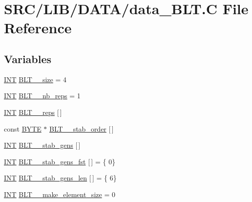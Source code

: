 \hypertarget{data___b_l_t_8_c}{}\section{S\+R\+C/\+L\+I\+B/\+D\+A\+T\+A/data\+\_\+\+B\+LT.C File Reference}
\label{data___b_l_t_8_c}
\subsection*{Variables}
\begin{DoxyCompactItemize}
\item 
\mbox{\hyperlink{galois_8h_a09fddde158a3a20bd2dcadb609de11dc}{I\+NT}} \mbox{\hyperlink{data___b_l_t_8_c_a616a7a4dfcb118027e526a5b27d126c9}{B\+L\+T\+\_\+\_\+size}} = 4
\item 
\mbox{\hyperlink{galois_8h_a09fddde158a3a20bd2dcadb609de11dc}{I\+NT}} \mbox{\hyperlink{data___b_l_t_8_c_afef84fd19483acb94ffc32c731590c4b}{B\+L\+T\+\_\+\_\+nb\+\_\+reps}} = 1
\item 
\mbox{\hyperlink{galois_8h_a09fddde158a3a20bd2dcadb609de11dc}{I\+NT}} \mbox{\hyperlink{data___b_l_t_8_c_acbd3ae9c00f66ba2368490308679b8b3}{B\+L\+T\+\_\+\_\+reps}} \mbox{[}$\,$\mbox{]}
\item 
const \mbox{\hyperlink{galois_8h_ab6cc7b4aeb6ea31aba2b3fbfc83ff5e6}{B\+Y\+TE}} $\ast$ \mbox{\hyperlink{data___b_l_t_8_c_aa976176410422e38132b321c8bf95e98}{B\+L\+T\+\_\+\_\+stab\+\_\+order}} \mbox{[}$\,$\mbox{]}
\item 
\mbox{\hyperlink{galois_8h_a09fddde158a3a20bd2dcadb609de11dc}{I\+NT}} \mbox{\hyperlink{data___b_l_t_8_c_a1dcfb9273f5b0bca1182bd1a63d6d686}{B\+L\+T\+\_\+\_\+stab\+\_\+gens}} \mbox{[}$\,$\mbox{]}
\item 
\mbox{\hyperlink{galois_8h_a09fddde158a3a20bd2dcadb609de11dc}{I\+NT}} \mbox{\hyperlink{data___b_l_t_8_c_a851644ea65473a48bf9d371d7d965a4b}{B\+L\+T\+\_\+\_\+stab\+\_\+gens\+\_\+fst}} \mbox{[}$\,$\mbox{]} = \{ 0\}
\item 
\mbox{\hyperlink{galois_8h_a09fddde158a3a20bd2dcadb609de11dc}{I\+NT}} \mbox{\hyperlink{data___b_l_t_8_c_a3e10816189bb7f4061f40679a0b581c1}{B\+L\+T\+\_\+\_\+stab\+\_\+gens\+\_\+len}} \mbox{[}$\,$\mbox{]} = \{ 6\}
\item 
\mbox{\hyperlink{galois_8h_a09fddde158a3a20bd2dcadb609de11dc}{I\+NT}} \mbox{\hyperlink{data___b_l_t_8_c_a37db166f491e9d769fc72384d9965f41}{B\+L\+T\+\_\+\_\+make\+\_\+element\+\_\+size}} = 0

\end{DoxyCompactItemize}

